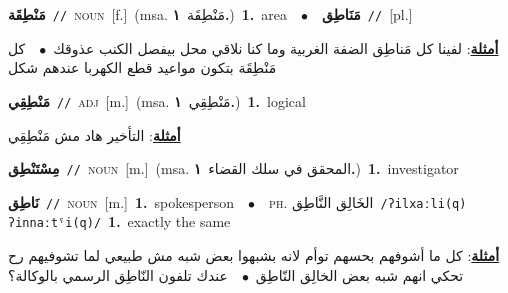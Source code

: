 \documentclass[10pt,a4paper,twoside]{article} %
\begin{document}
\begin{multicols}{2}
{\setlength\topsep{0pt}\textbf{\foreignlanguage{arabic}{مَنْطِقَة}}\ {\color{gray}\texttt{//}\color{black}}\ \textsc{noun}\ [f.]\ \color{gray}(msa. \foreignlanguage{arabic}{مَنْطِقَة}~\foreignlanguage{arabic}{\textbf{١.}})\color{black}\ \textbf{1.}~area\ \ $\bullet$\ \ \setlength\topsep{0pt}\textbf{\foreignlanguage{arabic}{مَنَاطِق}}\ {\color{gray}\texttt{//}\color{black}}\ [pl.]\  \begin{flushright}\color{gray}\foreignlanguage{arabic}{\textbf{\underline{\foreignlanguage{arabic}{أمثلة}}}: لفينا كل مَناطِق الضفة الغربية وما كنا نلاقي محل بيفصل الكنب عذوقك\ $\bullet$\ \  كل مَنْطِقَة بتكون مواعيد قطع الكهربا عندهم شكل}\end{flushright}\color{black}} \vspace{2mm}

{\setlength\topsep{0pt}\textbf{\foreignlanguage{arabic}{مَنْطِقِي}}\ {\color{gray}\texttt{//}\color{black}}\ \textsc{adj}\ [m.]\ \color{gray}(msa. \foreignlanguage{arabic}{مَنْطِقِي}~\foreignlanguage{arabic}{\textbf{١.}})\color{black}\ \textbf{1.}~logical\  \begin{flushright}\color{gray}\foreignlanguage{arabic}{\textbf{\underline{\foreignlanguage{arabic}{أمثلة}}}: التأخير هاد مش مَنْطِقِي}\end{flushright}\color{black}} \vspace{2mm}

{\setlength\topsep{0pt}\textbf{\foreignlanguage{arabic}{مِسْتَنْطِق}}\ {\color{gray}\texttt{//}\color{black}}\ \textsc{noun}\ [m.]\ \color{gray}(msa. \foreignlanguage{arabic}{المحقق في سلك القضاء}~\foreignlanguage{arabic}{\textbf{١.}})\color{black}\ \textbf{1.}~investigator\ } \vspace{2mm}

{\setlength\topsep{0pt}\textbf{\foreignlanguage{arabic}{نَاطِق}}\ {\color{gray}\texttt{//}\color{black}}\ \textsc{noun}\ [m.]\ \textbf{1.}~spokesperson\ \ $\bullet$\ \ \textsc{ph.} \color{gray} \foreignlanguage{arabic}{الخَالِق النَّاطِق}\color{black}\ {\color{gray}\texttt{/{\sffamily ʔilxaːli(q) ʔinnaːtˤi(q)}/}\color{black}}\ \textbf{1.}~exactly the same\  \begin{flushright}\color{gray}\foreignlanguage{arabic}{\textbf{\underline{\foreignlanguage{arabic}{أمثلة}}}: كل ما أشوفهم بحسهم توأم لانه بشبهوا بعض شبه مش طبيعي لما تشوفيهم رح تحكي انهم شبه بعض الخالِق النّاطِق\ $\bullet$\ \  عندك تلفون النّاطِق الرسمي بالوكالة؟}\end{flushright}\color{black}} \vspace{2mm}


\end{multicols}
\end{document}
